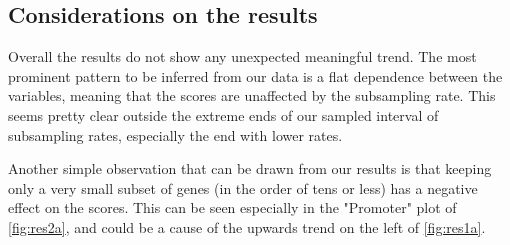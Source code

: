 \subsection{Considerations on the results}
Overall the results do not show any unexpected meaningful trend. The most prominent pattern to be inferred from our data is a flat dependence between the variables, meaning that the scores are unaffected by the subsampling rate. This seems pretty clear outside the extreme ends of our sampled interval of subsampling rates, especially the end with lower rates.

Another simple observation that can be drawn from our results is that keeping only a very small subset of genes (in the order of tens or less) has a negative effect on the scores.
This can be seen especially in the "Promoter" plot of \autoref{fig:res2a}, and could be a cause of the upwards trend on the left of \autoref{fig:res1a}.

